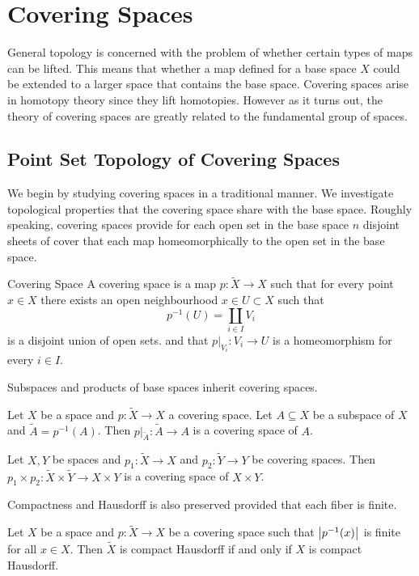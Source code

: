 \documentclass[a4paper]{article}
\begin{document}
\pagebreak
\section{Covering Spaces}
General topology is concerned with the problem of whether certain types of maps can be lifted. This means that whether a map defined for a base space $X$ could be extended to a larger space that contains the base space. Covering spaces arise in homotopy theory since they lift homotopies. However as it turns out, the theory of covering spaces are greatly related to the fundamental group of spaces. 

\subsection{Point Set Topology of Covering Spaces}
We begin by studying covering spaces in a traditional manner. We investigate topological properties that the covering space share with the base space. Roughly speaking, covering spaces provide for each open set in the base space $n$ disjoint sheets of cover that each map homeomorphically to the open set in the base space. 

\begin{defn}{Covering Space}{} A covering space is a map $p:\tilde{X}\to X$ such that for every point $x\in X$ there exists an open neighbourhood $x\in U\subset X$ such that $$p^{-1}(U)=\coprod_{i\in I}V_i$$ is a disjoint union of open sets. and that $p|_{V_i}:V_i\to U$ is a homeomorphism for every $i\in I$. 
\end{defn}

Subspaces and products of base spaces inherit covering spaces. 

\begin{prp}{}{} Let $X$ be a space and $p:\tilde{X}\to X$ a covering space. Let $A\subseteq X$ be a subspace of $X$ and $\tilde{A}=p^{-1}(A)$. Then $p|_{\tilde{A}}:\tilde{A}\to A$ is a covering space of $A$. 
\end{prp}

\begin{prp}{}{} Let $X,Y$ be spaces and $p_1:\tilde{X}\to X$ and $p_2:\tilde{Y}\to Y$ be covering spaces. Then $p_1\times p_2:\tilde{X}\times\tilde{Y}\to X\times Y$ is a covering space of $X\times Y$. 
\end{prp}

Compactness and Hausdorff is also preserved provided that each fiber is finite. 

\begin{prp}{}{} Let $X$ be a space and $p:\tilde{X}\to X$ be a covering space such that $\abs{p^{-1}(x)}$ is finite for all $x\in X$. Then $\tilde{X}$ is compact Hausdorff if and only if $X$ is compact Hausdorff. 
\end{prp}
\end{document}
